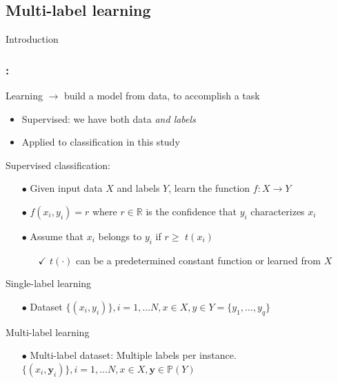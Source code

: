 \documentclass{beamer}
\begin{document}
\subsection{Multi-label learning}
\begin{frame}
\Huge{\centerline{Introduction}}
\end{frame}
\begin{frame}
\frametitle{\insertsection : \insertsubsection}
Learning $\rightarrow$ build a model from data, to accomplish a task
\begin{itemize}
  \item Supervised: we have both data \emph{and labels}
\item Applied to classification in this study
\end{itemize}
Supervised classification:
\begin{itemize}
\item[$\bullet$] Given input data $X$ and labels  $Y$,
  learn the function $f: X \rightarrow Y$ 
\item[$\bullet$] $f(x_i, y_i) = r$ where $r\in \mathbb{R}$ is the confidence that $y_i$ characterizes $x_i$
\item[$\bullet$] Assume that $x_i$ belongs to $y_i$ if $r \ge $ $t(x_i)$
\begin{itemize}%
\item[$\checkmark$] $t(\cdot)$ can be a predetermined constant function or learned from $X$
\end{itemize}
\end{itemize}

Single-label learning
\begin{itemize}
\item[$\bullet$] Dataset $\{ (x_i, y_i)\}, i = 1, \dots N, x \in X, y \in Y=\{y_1,\dots,y_q\}$
\end{itemize}

Multi-label learning
\begin{itemize}
\item[$\bullet$] Multi-label dataset: Multiple labels per instance. $\{ (x_i, \bm{y}_i)\}, i = 1, \dots N, x \in X, \bm{y} \in \mathbb{P}(Y)$

\end{itemize}
\end{frame}
\end{document}
